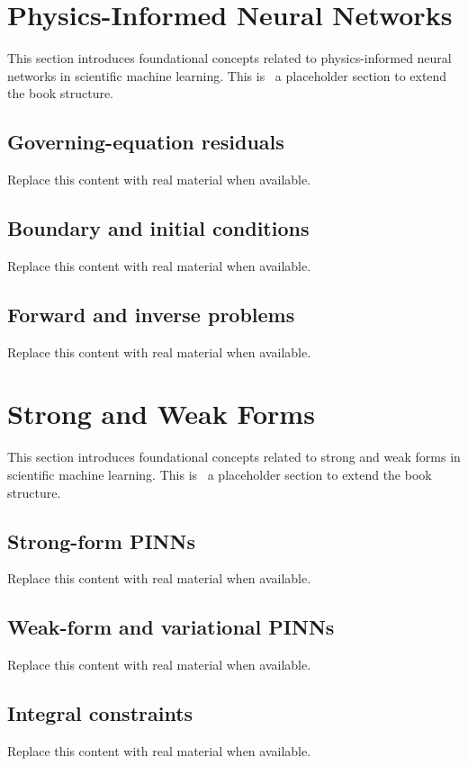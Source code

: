 
\section{Physics-Informed Neural Networks}
This section introduces foundational concepts related to physics-informed neural networks in scientific machine learning. This is~\cite{abdulmaksoudTransformerBasedSensorFusion2025} a placeholder section to extend the book structure.

\subsection{Governing-equation residuals}
Replace this content with real material when available.

\subsection{Boundary and initial conditions}
Replace this content with real material when available.

\subsection{Forward and inverse problems}
Replace this content with real material when available.

\section{Strong and Weak Forms}
This section introduces foundational concepts related to strong and weak forms in scientific machine learning. This is~\cite{abdulmaksoudTransformerBasedSensorFusion2025} a placeholder section to extend the book structure.

\subsection{Strong-form PINNs}
Replace this content with real material when available.

\subsection{Weak-form and variational PINNs}
Replace this content with real material when available.

\subsection{Integral constraints}
Replace this content with real material when available.

